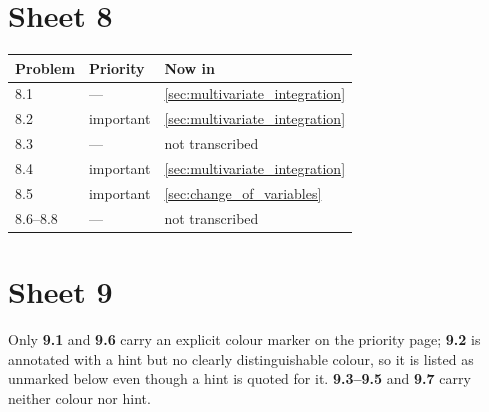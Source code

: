 \section{Sheet 8}
\label{sec:sheet_index_8}

\begin{center}
\begin{tabular}{@{}l l l@{}}
\textbf{Problem} & \textbf{Priority} & \textbf{Now in} \\
\hline
8.1 & --- & \cref{sec:multivariate_integration} \\[3pt]
8.2 & important & \cref{sec:multivariate_integration} \\[3pt]
8.3 & --- & not transcribed \\[3pt]
8.4 & important & \cref{sec:multivariate_integration} \\[3pt]
8.5 & important & \cref{sec:change_of_variables} \\[3pt]
8.6--8.8 & --- & not transcribed \\
\end{tabular}
\end{center}


\section{Sheet 9}
\label{sec:sheet_index_9}

Only \textbf{9.1} and \textbf{9.6} carry an explicit colour marker on the priority page;
\textbf{9.2} is annotated with a hint but no clearly distinguishable colour, so it is listed as
unmarked below even though a hint is quoted for it. \textbf{9.3--9.5} and \textbf{9.7} carry
neither colour nor hint.


